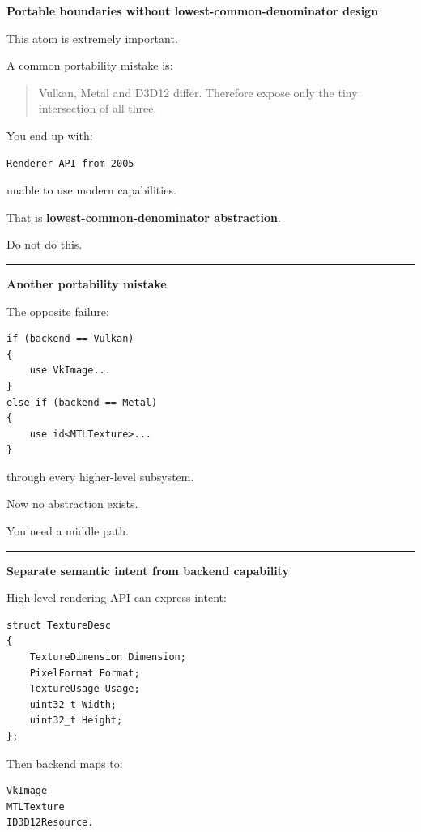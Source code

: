 \textbf{Portable boundaries without lowest-common-denominator design}

This atom is extremely important.

A common portability mistake is:

\begin{quote}
Vulkan, Metal and D3D12 differ. Therefore expose only the tiny intersection of all three.
\end{quote}

You end up with:

\begin{verbatim}
Renderer API from 2005
\end{verbatim}

unable to use modern capabilities.

That is \textbf{lowest-common-denominator abstraction}.

Do not do this.

\begin{center}\rule{0.5\linewidth}{0.5pt}\end{center}

\textbf{Another portability mistake}

The opposite failure:

\begin{verbatim}
if (backend == Vulkan)
{
    use VkImage...
}
else if (backend == Metal)
{
    use id<MTLTexture>...
}
\end{verbatim}

through every higher-level subsystem.

Now no abstraction exists.

You need a middle path.

\begin{center}\rule{0.5\linewidth}{0.5pt}\end{center}

\textbf{Separate semantic intent from backend capability}

High-level rendering API can express intent:

\begin{verbatim}
struct TextureDesc
{
    TextureDimension Dimension;
    PixelFormat Format;
    TextureUsage Usage;
    uint32_t Width;
    uint32_t Height;
};
\end{verbatim}

Then backend maps to:

\begin{verbatim}
VkImage
MTLTexture
ID3D12Resource.
\end{verbatim}

